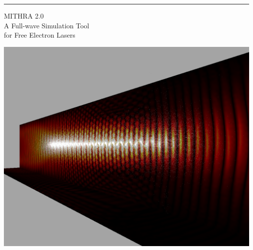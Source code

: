 \documentclass{report}
\begin{document}
\begin{titlepage}
\begin{center}
  \hrule \vspace{3mm}
  {\Huge {MITHRA 2.0} \vspace{10mm} } \\
  {\LARGE {\sc A Full-wave Simulation Tool } \vspace{3mm} } \\
  {\LARGE {for Free Electron Lasers \vspace{3mm} } } \\
\end{center}

\vspace{5mm}


\begin{center}
   \includegraphics[width=180mm]{coverFigure.png}
\end{center}

\vspace{5mm}


\end{titlepage}
\end{document}
